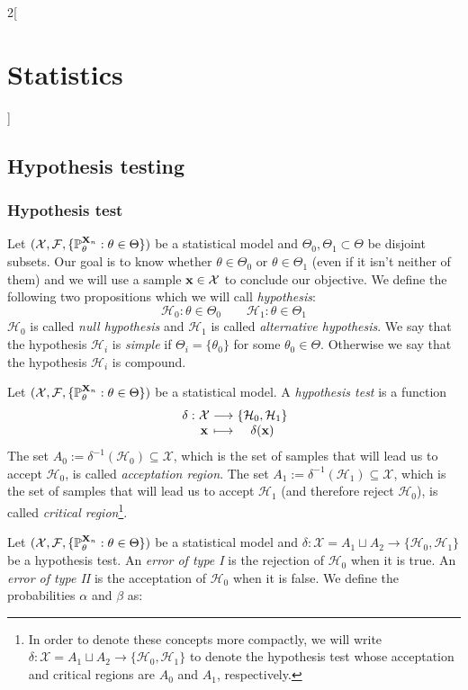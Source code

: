 \documentclass[../../../main.tex]{subfiles}
\begin{document}
\begin{multicols}{2}[\section{Statistics}]
  \subsection{Hypothesis testing}
  \subsubsection{Hypothesis test}
  \begin{definition}
    Let $(\mathcal{X},\mathcal{F},\{\mathbb{P}_\theta^{\boldsymbol{\mathrm{X}}_n}:\theta\in\Theta\})$ be a statistical model and $\Theta_0,\Theta_1\subset\Theta$ be disjoint subsets. Our goal is to know whether $\theta\in\Theta_0$ or $\theta\in\Theta_1$ (even if it isn't neither of them) and we will use a sample $\boldsymbol{\mathrm{x}}\in\mathcal{X}$ to conclude our objective. We define the following two propositions which we will call \emph{hypothesis}:
    $$\mathcal{H}_0:\theta\in\Theta_0\qquad\mathcal{H}_1:\theta\in\Theta_1$$
    $\mathcal{H}_0$ is called \emph{null hypothesis} and $\mathcal{H}_1$ is called \emph{alternative hypothesis}. We say that the hypothesis $\mathcal{H}_i$ is \emph{simple} if $\Theta_i=\{\theta_0\}$ for some $\theta_0\in\Theta$. Otherwise we say that the hypothesis $\mathcal{H}_i$ is compound.
  \end{definition}
  \begin{definition}
    Let $(\mathcal{X},\mathcal{F},\{\mathbb{P}_\theta^{\boldsymbol{\mathrm{X}}_n}:\theta\in\Theta\})$ be a statistical model. A \emph{hypothesis test} is a function $$\function{\delta}{\mathcal{X}}{\{\mathcal{H}_0,\mathcal{H}_1\}}{\vf{x}}{\delta(\vf{x})}$$
    The set $A_0:=\delta^{-1}(\mathcal{H}_0)\subseteq \mathcal{X}$, which is the set of samples that will lead us to accept $\mathcal{H}_0$, is called \emph{acceptation region}. The set $A_1:=\delta^{-1}(\mathcal{H}_1)\subseteq \mathcal{X}$, which is the set of samples that will lead us to accept $\mathcal{H}_1$ (and therefore reject $\mathcal{H}_0$), is called \emph{critical region}\footnote{In order to denote these concepts more compactly, we will write $\delta:\mathcal{X}=A_1\sqcup A_2\rightarrow\{\mathcal{H}_0,\mathcal{H}_1\}$ to denote the hypothesis test whose acceptation and critical regions are $A_0$ and $A_1$, respectively.}.
  \end{definition}
  \begin{definition}
    Let $(\mathcal{X},\mathcal{F},\{\mathbb{P}_\theta^{\boldsymbol{\mathrm{X}}_n}:\theta\in\Theta\})$ be a statistical model and $\delta:\mathcal{X}=A_1\sqcup A_2\rightarrow\{\mathcal{H}_0,\mathcal{H}_1\}$ be a hypothesis test. An \emph{error of type I} is the rejection of $\mathcal{H}_0$ when it is true. An \emph{error of type II} is the acceptation of $\mathcal{H}_0$ when it is false. We define the probabilities $\alpha$ and $\beta$ as:

\end{definition}
\end{multicols}
\end{document}

